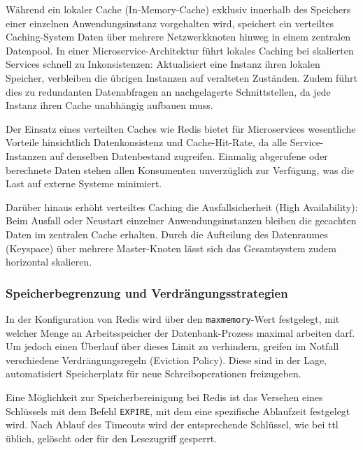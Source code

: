 Während ein lokaler Cache (In-Memory-Cache) exklusiv innerhalb des Speichers einer einzelnen Anwendungsinstanz vorgehalten wird, speichert ein verteiltes Caching-System Daten über mehrere Netzwerkknoten hinweg in einem zentralen Datenpool. In einer Microservice-Architektur führt lokales Caching bei skalierten Services schnell zu Inkonsistenzen: Aktualisiert eine Instanz ihren lokalen Speicher, verbleiben die übrigen Instanzen auf veralteten Zuständen. Zudem führt dies zu redundanten Datenabfragen an nachgelagerte Schnittstellen, da jede Instanz ihren Cache unabhängig aufbauen muss.

Der Einsatz eines verteilten Caches wie Redis bietet für Microservices wesentliche Vorteile hinsichtlich Datenkonsistenz und Cache-Hit-Rate, da alle Service-Instanzen auf denselben Datenbestand zugreifen. Einmalig abgerufene oder berechnete Daten stehen allen Konsumenten unverzüglich zur Verfügung, was die Last auf externe Systeme minimiert.

Darüber hinaus erhöht verteiltes Caching die Ausfallsicherheit (High Availability): Beim Ausfall oder Neustart einzelner Anwendungsinstanzen bleiben die gecachten Daten im zentralen Cache erhalten. Durch die Aufteilung des Datenraumes (Keyspace) über mehrere Master-Knoten lässt sich das Gesamtsystem zudem horizontal skalieren.


\subsubsection{Speicherbegrenzung und Verdrängungsstrategien}
\label{subsubsec:redis_eviction}

In der Konfiguration von Redis wird über den \texttt{maxmemory}-Wert festgelegt, mit welcher Menge an Arbeitsspeicher der Datenbank-Prozess maximal arbeiten darf. Um jedoch einen Überlauf über dieses Limit zu verhindern, greifen im Notfall verschiedene Verdrängungsregeln (Eviction Policy). Diese sind in der Lage, automatisiert Speicherplatz für neue Schreiboperationen freizugeben.

Eine Möglichkeit zur Speicherbereinigung bei Redis ist das Versehen eines Schlüssels mit dem Befehl \texttt{EXPIRE}, mit dem eine spezifische Ablaufzeit festgelegt wird. Nach Ablauf des Timeouts wird der entsprechende Schlüssel, wie bei \ac{ttl} üblich, gelöscht oder für den Lesezugriff gesperrt.

